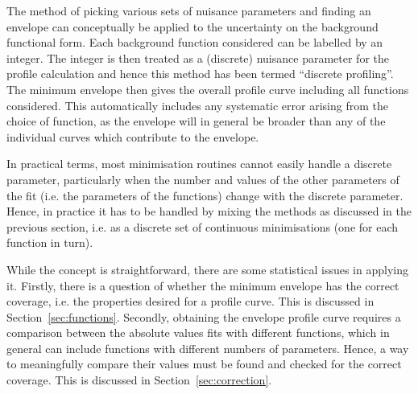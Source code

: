 The method of picking various sets of nuisance parameters and finding
an envelope can conceptually be applied to the uncertainty on the background functional form.
Each background function considered can be labelled by an
integer. The integer is then treated as a (discrete) nuisance parameter
for the profile calculation and hence this method has been termed
``discrete profiling''.
The minimum envelope then gives the overall profile curve including
all functions considered. This automatically includes any systematic error
arising from the choice of function, as the envelope will in general be broader
than any of the individual curves which contribute to the envelope.

In practical terms, most minimisation routines
cannot easily handle a discrete parameter, particularly when the
number and values of the other parameters of the fit (i.e. the parameters
of the functions) change with the discrete parameter.
Hence, in practice it has
to be handled by mixing the methods as discussed in the previous section,
i.e. as a discrete set of continuous minimisations (one for each function in turn).

While the concept is straightforward, there are some statistical
issues in applying it.
Firstly, there is a question of whether the \nll minimum envelope has the correct coverage,
i.e. the properties desired for a profile curve.
This is discussed in Section~\ref{sec:functions}.
Secondly, obtaining the envelope profile curve requires a
comparison between the absolute \nll values fits with different functions, which
in general can include functions with different numbers of parameters.
Hence, a way to meaningfully compare their \nll values must be found and checked for the correct coverage.
This is discussed in Section~\ref{sec:correction}.
